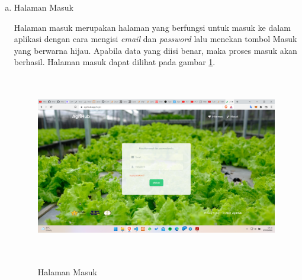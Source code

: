 \begin{enumerate}
\begin{enumerate}[a.]
		\newpage
		\item Halaman Masuk
		\par Halaman masuk merupakan halaman yang berfungsi untuk masuk ke dalam aplikasi dengan cara mengisi \textit{email} dan \textit{password} lalu menekan tombol Masuk yang berwarna hijau. Apabila data yang diisi benar, maka proses masuk akan berhasil. Halaman masuk dapat dilihat pada gambar \ref*{login}.
		\begin{figure}[H]
			\centering
			{\includegraphics [width = 13.5cm, height= 8cm]{gambar/login}}
			\caption{Halaman Masuk}
			\label{login}
		\end{figure}
	

\end{enumerate}
\end{enumerate}
